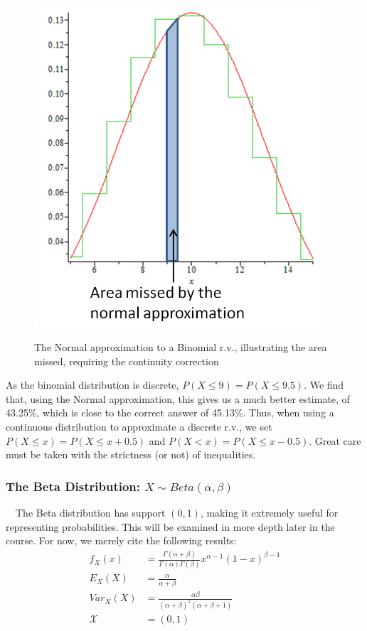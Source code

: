 \documentclass[12pt,a4paper]{article}
\begin{document}
\begin{figure}[h]
\begin{center}
\includegraphics[height=11.97cm,width=10.6cm]{M2S1 Normal Approximation.png}
\caption{The Normal approximation to a Binomial r.v., illustrating the area missed, requiring the continuity correction}\label{importance sampling}\label{normal approximation}
\end{center}
\end{figure}

As the binomial distribution is discrete, $P(X \leq 9) = P(X \leq 9.5)$. We find that, using the Normal approximation, this gives us a much better estimate, of 43.25\%, which is close to the correct answer of 45.13\%. Thus, when using a continuous distribution to approximate a discrete r.v., we set $P(X \leq x) = P(X \leq x+0.5)$ and $P(X < x) = P(X \leq x-0.5)$. Great care must be taken with the strictness (or not) of inequalities.

\subsubsection{The Beta Distribution: $X \sim Beta(\alpha,\beta)$}

$\quad$The Beta distribution has support $(0,1)$, making it extremely useful for representing probabilities. This will be examined in more depth later in the course. For now, we merely cite the following results:
\begin{align*}
f_X(x) &= \frac{\Gamma(\alpha + \beta)}{\Gamma(\alpha)\Gamma(\beta)}x^{\alpha-1}(1-x)^{\beta-1}\\
E_{X}(X) &= \frac{\alpha}{\alpha + \beta}\\
Var_{X}(X) &= \frac{\alpha\beta}{(\alpha + \beta)^2(\alpha + \beta + 1)}\\
\mathcal{X} &= (0,1)
\end{align*}
\end{document}
